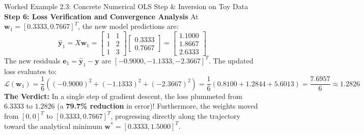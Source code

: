 \begin{examplebox}[breakable]{Worked Example 2.3: Concrete Numerical OLS Step \& Inversion on Toy Data}
\textbf{Step 6: Loss Verification and Convergence Analysis}
At $\mathbf{w}_1 = [0.3333, 0.7667]^T$, the new model predictions are:
\begin{equation*}
\hat{\mathbf{y}}_1 = X\mathbf{w}_1 = \begin{bmatrix} 1 & 1 \\ 1 & 2 \\ 1 & 3 \end{bmatrix} \begin{bmatrix} 0.3333 \\ 0.7667 \end{bmatrix} = \begin{bmatrix} 1.1000 \\ 1.8667 \\ 2.6333 \end{bmatrix}
\end{equation*}
The new residuals $\mathbf{e}_1 = \hat{\mathbf{y}}_1 - \mathbf{y}$ are $[-0.9000, -1.1333, -2.3667]^T$.
The updated loss evaluates to:
\begin{equation*}
\mathcal{L}(\mathbf{w}_1) = \frac{1}{6} \left( (-0.9000)^2 + (-1.1333)^2 + (-2.3667)^2 \right) = \frac{1}{6}(0.8100 + 1.2844 + 5.6013) = \frac{7.6957}{6} \approx \mathbf{1.2826}
\end{equation*}
\textbf{The Verdict:} In a single step of gradient descent, the loss plummeted from $\mathbf{6.3333}$ to $\mathbf{1.2826}$ (a \textbf{79.7\% reduction} in error)! Furthermore, the weights moved from $[0, 0]^T$ to $[0.3333, 0.7667]^T$, progressing directly along the trajectory toward the analytical minimum $\mathbf{w}^* = [0.3333, 1.5000]^T$.
\end{examplebox}

